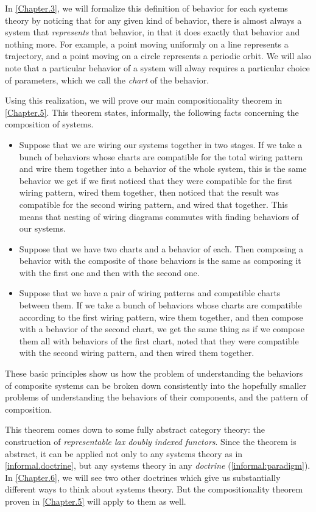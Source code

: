 \documentclass[DynamicalBook]{subfiles}
\begin{document}
In \cref{Chapter.3}, we will formalize this definition of behavior for each systems theory by noticing that for any given kind of behavior, there is almost always a system that \emph{represents} that behavior, in that it does exactly that behavior and nothing more. For example, a point moving uniformly on a line represents a trajectory, and a point moving on a circle represents a periodic orbit. We will also note that a particular behavior of a system will alway requires a particular choice of parameters, which we call the \emph{chart} of the behavior.

Using this realization, we will prove our main compositionality theorem in \cref{Chapter.5}. This theorem states, informally, the following facts concerning the composition of systems.
\begin{itemize}
  \item Suppose that we are wiring
    our systems together in two stages. If we take a
    bunch of behaviors whose charts are compatible for the total wiring pattern
    and wire them together into a behavior of the whole system, this is the same
    behavior we get if we first noticed that they were compatible for the first
    wiring pattern, wired them together, then noticed that the result was
    compatible for the second wiring pattern, and wired that together. This
    means that nesting of wiring diagrams commutes with finding behaviors of our systems.
  \item Suppose that we have two
    charts and a behavior of each. Then composing a behavior with the composite of those behaviors is the same as composing
    it with the first one and then with the second one.
  \item Suppose that we have a pair of
    wiring patterns and compatible charts between them. If we
    take a bunch of behaviors whose charts are compatible according to the first
    wiring pattern, wire them together, and then compose with a behavior of the
    second chart, we get the same thing as if we compose them all with behaviors
    of the first chart, noted that they were compatible with the second wiring
    pattern, and then wired them together.
\end{itemize}

These basic principles show us how the problem of understanding the behaviors of composite systems can be broken down consistently into the hopefully smaller problems of understanding the behaviors of their components, and the pattern of composition.

This theorem comes down to some fully abstract category theory: the construction of \emph{representable lax doubly indexed functors}. Since the theorem is abstract, it can be applied not only to any systems theory as in \cref{informal.doctrine}, but any systems theory in any \emph{doctrine} (\cref{informal:paradigm}). In \cref{Chapter.6}, we will see two other doctrines which give us substantially different ways to think about systems theory. But the compositionality theorem proven in \cref{Chapter.5} will apply to them as well.
\end{document}
